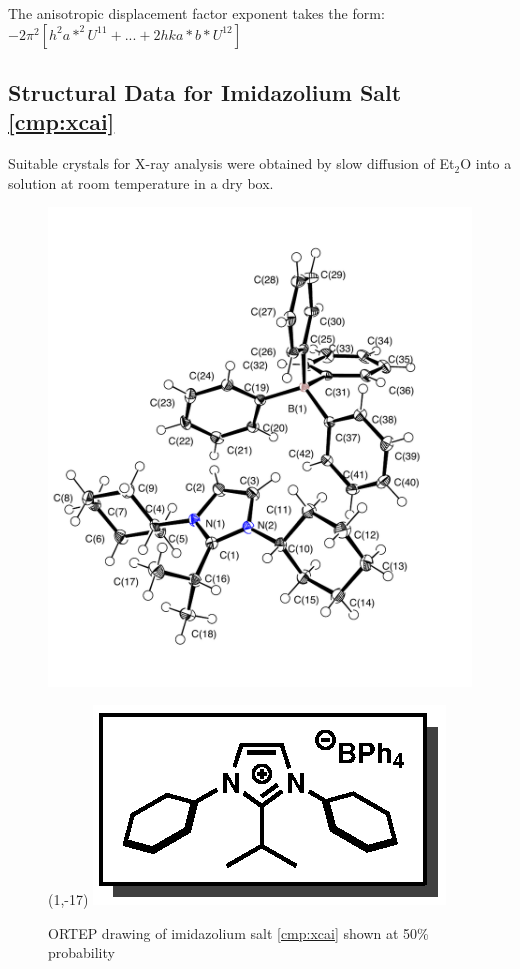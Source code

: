 { \footnotesize
The anisotropic displacement factor exponent takes the form: 
$-2\pi^2\left[ h^2a*^2U^{11} + ... + 2 h k a* b* U^{12} \right]$ }

\pagebreak

\subsection{Structural Data for Imidazolium Salt \ref{cmp:xcai}}
Suitable crystals for X-ray analysis were obtained by slow diffusion of Et$_2$O into a 
solution at room temperature in a dry box. 
\begin{figure}[h]
  \centering
  \includegraphics[width=5.2in]{chp_alkylation/images/xray/xcai_labelled}
    \begin{textblock}{1}(1,-17)
\includegraphics[scale=0.8]{chp_alkylation/images/xcai}
\end{textblock}
  \caption{ORTEP drawing of  imidazolium salt \ref{cmp:xcai} shown at 50\% probability }
\end{figure}

